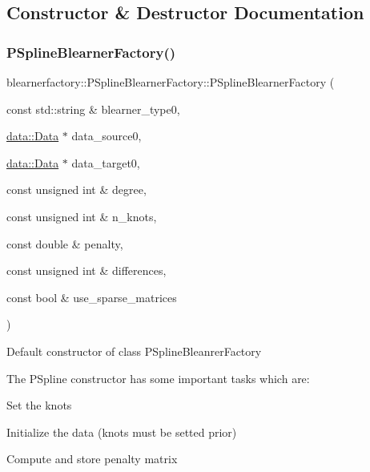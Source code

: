 \subsection{Constructor \& Destructor Documentation}
\mbox{\label{classblearnerfactory_1_1_p_spline_blearner_factory_af0b1b2a0c594d4adfd038a467a32649d}} 
\subsubsection{\texorpdfstring{P\+Spline\+Blearner\+Factory()}{PSplineBlearnerFactory()}}
{\footnotesize\ttfamily blearnerfactory\+::\+P\+Spline\+Blearner\+Factory\+::\+P\+Spline\+Blearner\+Factory (\begin{DoxyParamCaption}\item[{const std\+::string \&}]{blearner\+\_\+type0,  }\item[{\hyperlink{classdata_1_1_data}{data\+::\+Data} $\ast$}]{data\+\_\+source0,  }\item[{\hyperlink{classdata_1_1_data}{data\+::\+Data} $\ast$}]{data\+\_\+target0,  }\item[{const unsigned int \&}]{degree,  }\item[{const unsigned int \&}]{n\+\_\+knots,  }\item[{const double \&}]{penalty,  }\item[{const unsigned int \&}]{differences,  }\item[{const bool \&}]{use\+\_\+sparse\+\_\+matrices }\end{DoxyParamCaption})}



Default constructor of class {\ttfamily P\+Spline\+Bleanrer\+Factory} 

The P\+Spline constructor has some important tasks which are\+:
\begin{DoxyItemize}
\item Set the knots
\item Initialize the data (knots must be setted prior)
\item Compute and store penalty matrix
\end{DoxyItemize}


